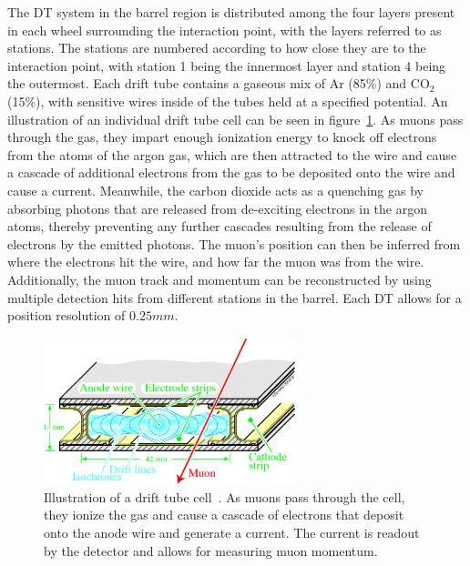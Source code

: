 The DT system in the barrel region is distributed among the four layers present in each wheel surrounding the interaction point, with the layers referred to as stations.
The stations are numbered according to how close they are to the interaction point, with station 1 being the innermost layer and station 4 being the outermost.
Each drift tube contains a gaseous mix of Ar (85\%) and CO$_2$ (15\%), with sensitive wires inside of the tubes held at a specified potential.
An illustration of an individual drift tube cell can be seen in figure~\ref{fig:CMSDTcell}.
As muons pass through the gas, they impart enough ionization energy to knock off electrons from the atoms of the argon gas, which are then attracted to the wire and cause a cascade of additional electrons from the gas to be deposited onto the wire and cause a current.
Meanwhile, the carbon dioxide acts as a quenching gas by absorbing photons that are released from de-exciting electrons in the argon atoms, thereby preventing any further cascades resulting from the release of electrons by the emitted photons.
The muon's position can then be inferred from where the electrons hit the wire, and how far the muon was from the wire.
Additionally, the muon track and momentum can be reconstructed by using multiple detection hits from different stations in the barrel.
Each DT allows for a position resolution of $0.25\unit{mm}$.

\begin{figure}[htbp]
  \centering
  \includegraphics[width=0.65\textwidth]{fig/experiment/cms_DTcell.pdf}
  \caption[
    Illustration of a drift tube cell.
    As muons pass through the cell, they ionize the gas and cause a cascade of electrons that deposit onto the anode wire and generate a current.
    The current is readout by the detector and allows for measuring muon momentum.
  ]{
    Illustration of a drift tube cell~\cite{Abbiendi_2019}.
    As muons pass through the cell, they ionize the gas and cause a cascade of electrons that deposit onto the anode wire and generate a current.
    The current is readout by the detector and allows for measuring muon momentum.
  }
  \label{fig:CMSDTcell}
\end{figure}

